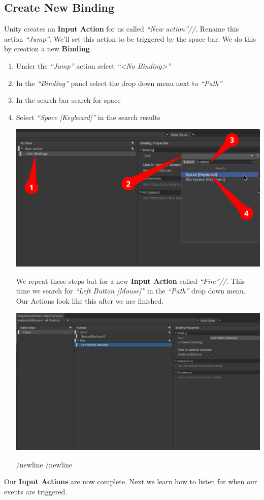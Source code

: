 \documentclass[a4paper,11pt,twoside]{article}
\begin{document}
\subsection*{Create New Binding}
\label{sec:org8faf7e8}
Unity creates an \textbf{Input Action} for us called \emph{``New action''//}. Rename this action \emph{``Jump''}. We'll set this action to be triggered by the space bar. We do this by creation a new \textbf{Binding}.
\begin{enumerate}
\item Under the \emph{``Jump''} action select \emph{``<No Binding>''}
\item In the \emph{``Binding''} panel select the drop down menu next to \emph{``Path''}
\item In the search bar search for space
\item Select \emph{``Space [Keyboard]''} in the search results
\begin{center}
\includegraphics[width=.9\linewidth]{./SnapShots/AddBinding.png}
\end{center}
We repeat these steps but for a new \textbf{Input Action} called \emph{``Fire''//}. This time we search for \emph{``Left Button [Mouse]''} in the \emph{``Path''} drop down menu. Our Actions look like this after we are finished.
\begin{center}
\includegraphics[width=.9\linewidth]{./SnapShots/FinalActions.png}
\end{center}
/newline
/newline
\end{enumerate}
Our \textbf{Input Actions} are now complete. Next we learn how to listen for when our events are triggered.
\end{document}

